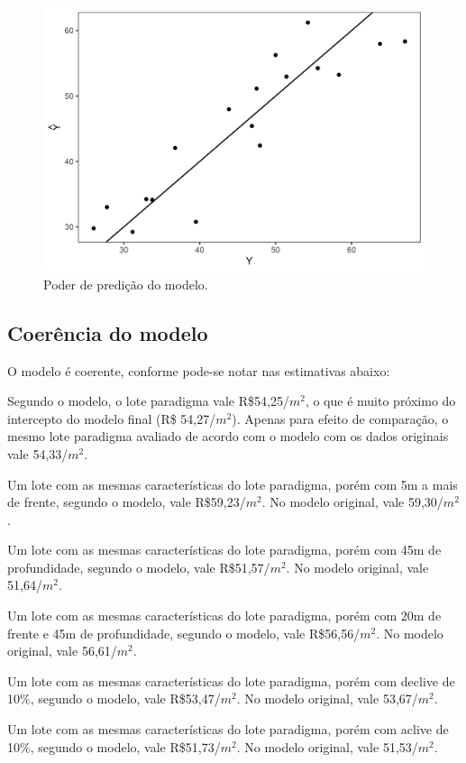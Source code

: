 \documentclass[a4paper, 12pt]{article}
\begin{document}
\begin{figure}[H]

{\centering \includegraphics[width=0.7\linewidth]{images/pplot-1} 

}

\caption{Poder de predição do modelo.}\label{fig:pplot}
\end{figure}

\hypertarget{coerencia-do-modelo}{%
\subsection{Coerência do modelo}\label{coerencia-do-modelo}}

O modelo é coerente, conforme pode-se notar nas estimativas abaixo:

Segundo o modelo, o lote paradigma vale R\$54,25/\(m^2\), o que é muito
próximo do intercepto do modelo final (R\$ 54,27/\(m^2\)). Apenas para
efeito de comparação, o mesmo lote paradigma avaliado de acordo com o
modelo com os dados originais vale 54,33/\(m^2\).

Um lote com as mesmas características do lote paradigma, porém com 5m a
mais de frente, segundo o modelo, vale R\$59,23/\(m^2\). No modelo
original, vale 59,30/\(m^2\).

Um lote com as mesmas características do lote paradigma, porém com 45m
de profundidade, segundo o modelo, vale R\$51,57/\(m^2\). No modelo
original, vale 51,64/\(m^2\).

Um lote com as mesmas características do lote paradigma, porém com 20m
de frente e 45m de profundidade, segundo o modelo, vale
R\$56,56/\(m^2\). No modelo original, vale 56,61/\(m^2\).

Um lote com as mesmas características do lote paradigma, porém com
declive de 10\%, segundo o modelo, vale R\$53,47/\(m^2\). No modelo
original, vale 53,67/\(m^2\).

Um lote com as mesmas características do lote paradigma, porém com
aclive de 10\%, segundo o modelo, vale R\$51,73/\(m^2\). No modelo
original, vale 51,53/\(m^2\).
\end{document}
